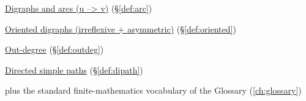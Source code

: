 \begin{closurepanel}
\item \hyperref[def:arc]{Digraphs and arcs (u --> v)} (\S\ref*{def:arc})
\item \hyperref[def:oriented]{Oriented digraphs (irreflexive + asymmetric)} (\S\ref*{def:oriented})
\item \hyperref[def:outdeg]{Out-degree} (\S\ref*{def:outdeg})
\item \hyperref[def:dipath]{Directed simple paths} (\S\ref*{def:dipath})
\item plus the standard finite-mathematics vocabulary of the Glossary (\cref{ch:glossary})
\end{closurepanel}

